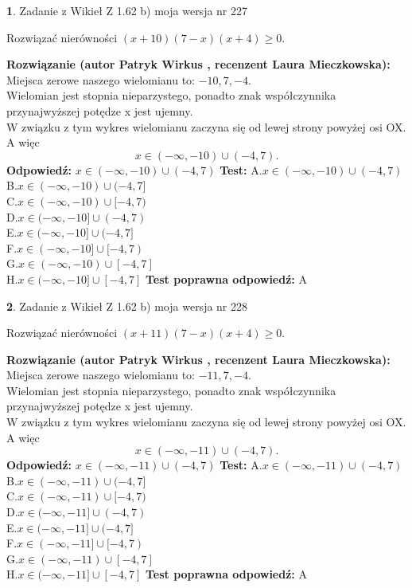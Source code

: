 \documentclass[12pt, a4paper]{article}
\theoremstyle{definition} %
\newtheorem{zad}{}
\newcommand{\zadStart}[1]{\begin{zad}#1\newline}
\newcommand{\zadStop}{\end{zad}}
\newcommand{\rozwStart}[2]{\noindent \textbf{Rozwiązanie (autor #1 , recenzent #2): }\newline}
\newcommand{\rozwStop}{\newline}
\newcommand{\odpStart}{\noindent \textbf{Odpowiedź:}\newline}
\newcommand{\odpStop}{\newline}
\newcommand{\testStart}{\noindent \textbf{Test:}\newline}
\newcommand{\testStop}{\newline}
\newcommand{\kluczStart}{\noindent \textbf{Test poprawna odpowiedź:}\newline}
\newcommand{\kluczStop}{\newline}
\begin{document}
\zadStart{Zadanie z Wikieł Z 1.62 b) moja wersja nr 227}

Rozwiązać nierówności $(x+10)(7-x)(x+4)\ge0$.
\zadStop
\rozwStart{Patryk Wirkus}{Laura Mieczkowska}
Miejsca zerowe naszego wielomianu to: $-10, 7, -4$.\\
Wielomian jest stopnia nieparzystego, ponadto znak współczynnika przy\linebreak najwyższej potędze x jest ujemny.\\ W związku z tym wykres wielomianu zaczyna się od lewej strony powyżej osi OX. A więc $$x \in (-\infty,-10) \cup (-4,7).$$
\rozwStop
\odpStart
$x \in (-\infty,-10) \cup (-4,7)$
\odpStop
\testStart
A.$x \in (-\infty,-10) \cup (-4,7)$\\
B.$x \in (-\infty,-10) \cup (-4,7]$\\
C.$x \in (-\infty,-10) \cup [-4,7)$\\
D.$x \in (-\infty,-10] \cup (-4,7)$\\
E.$x \in (-\infty,-10] \cup (-4,7]$\\
F.$x \in (-\infty,-10] \cup [-4,7)$\\
G.$x \in (-\infty,-10) \cup [-4,7]$\\
H.$x \in (-\infty,-10] \cup [-4,7]$
\testStop
\kluczStart
A
\kluczStop



\zadStart{Zadanie z Wikieł Z 1.62 b) moja wersja nr 228}

Rozwiązać nierówności $(x+11)(7-x)(x+4)\ge0$.
\zadStop
\rozwStart{Patryk Wirkus}{Laura Mieczkowska}
Miejsca zerowe naszego wielomianu to: $-11, 7, -4$.\\
Wielomian jest stopnia nieparzystego, ponadto znak współczynnika przy\linebreak najwyższej potędze x jest ujemny.\\ W związku z tym wykres wielomianu zaczyna się od lewej strony powyżej osi OX. A więc $$x \in (-\infty,-11) \cup (-4,7).$$
\rozwStop
\odpStart
$x \in (-\infty,-11) \cup (-4,7)$
\odpStop
\testStart
A.$x \in (-\infty,-11) \cup (-4,7)$\\
B.$x \in (-\infty,-11) \cup (-4,7]$\\
C.$x \in (-\infty,-11) \cup [-4,7)$\\
D.$x \in (-\infty,-11] \cup (-4,7)$\\
E.$x \in (-\infty,-11] \cup (-4,7]$\\
F.$x \in (-\infty,-11] \cup [-4,7)$\\
G.$x \in (-\infty,-11) \cup [-4,7]$\\
H.$x \in (-\infty,-11] \cup [-4,7]$
\testStop
\kluczStart
A
\kluczStop
\end{document}
